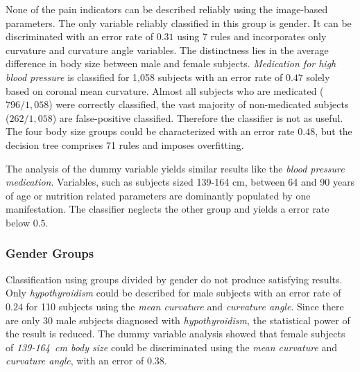\documentclass[a4paper,twoside]{style/article}
\begin{document}
None of the pain indicators can be described reliably using the image-based parameters.
The only variable reliably classified in this group is gender. %
%
It can be discriminated with an error rate of $0.31$ using 7 rules and incorporates only curvature and curvature angle variables.
The distinctness lies in the average difference in body size between male and female subjects.
%
\emph{Medication for high blood pressure} is classified for 1,058 subjects with an error rate of $0.47$ solely based on coronal mean curvature.
Almost all subjects who are medicated ($796/1,058$) were correctly classified, the vast majority of non-medicated subjects ($262/1,058$) are false-positive classified.
Therefore the classifier is not as useful.
The four body size groups could be characterized with an error rate $0.48$, but the decision tree comprises 71 rules and imposes overfitting.

The analysis of the dummy variable yields similar results like the \emph{blood pressure medication}.
Variables, such as subjects sized 139-164 cm, between 64 and 90 years of age or nutrition related parameters are dominantly populated by one manifestation.
The classifier neglects the other group and yields a error rate below $0.5$.
\subsubsection{Gender Groups}
Classification using groups divided by gender do not produce satisfying results.
Only \emph{hypothyroidism} could be described for male subjects with an error rate of $0.24$ for 110 subjects using the \emph{mean curvature} and \emph{curvature angle}.
Since there are only 30 male subjects diagnosed with \emph{hypothyroidism}, the statistical power of the result is reduced.
The dummy variable analysis showed that female subjects of \emph{139-164~cm body size} could be discriminated using the \emph{mean curvature} and \emph{curvature angle}, with an error of $0.38$.
\end{document}
